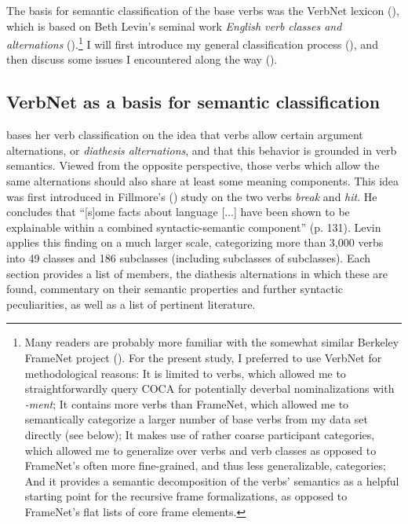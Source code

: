 The basis for semantic classification of the base verbs was the VerbNet lexicon (\citealt{Kipper.2005}), which is based on Beth Levin's seminal work \textit{English verb classes and alternations} (\citealt{Levin.1993}).\footnote{Many readers are probably more familiar with the somewhat similar Berkeley FrameNet project (\citealt{Fillmore.2003,Fillmore.2010}). For the present study, I preferred to use VerbNet for methodological reasons: It is limited to verbs, which allowed me to straightforwardly query COCA for potentially deverbal nominalizations with \textit{-ment}; It contains more verbs than FrameNet, which allowed me to semantically categorize a larger number of base verbs from my data set directly (see below); It makes use of rather coarse participant categories, which allowed me to generalize over verbs and verb classes \textendash{} as opposed to FrameNet's often more fine-grained, and thus less generalizable, categories; And it provides a semantic decomposition of the verbs' semantics as a helpful starting point for the recursive frame formalizations, as opposed to FrameNet's flat lists of core frame elements.}
I will first introduce my general classification process (), and then discuss some issues I encountered along the way ().

\subsection{VerbNet as a basis for semantic classification}
\label{sec:meth-Vsem-VN}

\citet{Levin.1993} bases her verb classification on the idea that verbs allow certain argument alternations, or \textit{diathesis alternations}, and that this behavior is grounded in verb semantics. Viewed from the opposite perspective, those verbs which allow the same alternations should also share at least some meaning components. This idea was first introduced in Fillmore's (\citeyear{Fillmore.1970}) study on the two verbs \textit{break} and \textit{hit}. He concludes that ``[s]ome facts about language [...] have been shown to be explainable within a combined syntactic-semantic component'' (p. 131). Levin applies this finding on a much larger scale, categorizing more than 3,000 verbs into 49 classes and 186 subclasses (including subclasses of subclasses). Each section provides a list of members, the diathesis alternations in which these are found, commentary on their semantic properties and further syntactic peculiarities, as well as a list of pertinent literature. 

